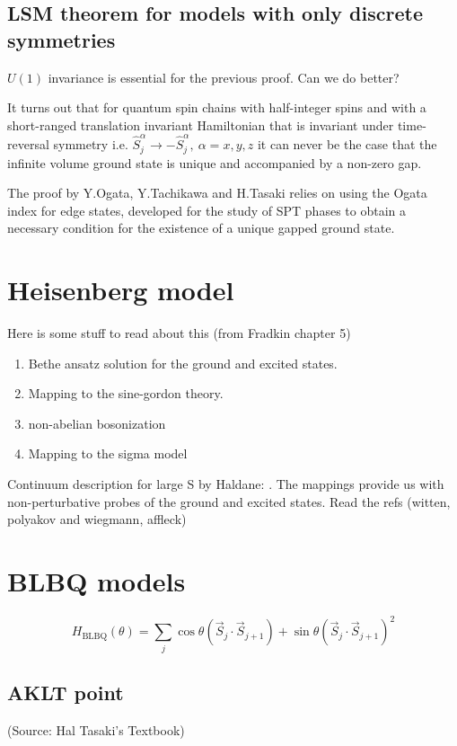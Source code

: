 \documentclass{article}
\begin{document}
\subsection{LSM theorem for models with only discrete symmetries}
$U(1)$ invariance is essential for the previous proof. Can we do better?

It turns out that for quantum spin chains with half-integer spins and with a short-ranged translation invariant Hamiltonian that is invariant under time-reversal symmetry i.e. $\hat{S}^{\alpha}_j \to  -\hat{S}^{\alpha}_j,~ \alpha = x, y, z$ it can never be the case that the infinite volume ground state is unique and accompanied by a non-zero gap.

The proof by Y.Ogata, Y.Tachikawa and H.Tasaki relies on using the Ogata index for edge states, developed for the study of SPT phases to obtain a necessary condition for the existence of a unique gapped ground state.
\section{Heisenberg model}
Here is some stuff to read about this (from Fradkin chapter 5)

\begin{enumerate}
    \item Bethe ansatz solution for the ground and excited states.
    \item Mapping to the sine-gordon theory.
    \item non-abelian bosonization
    \item Mapping to the sigma model
\end{enumerate}
Continuum description for large S by Haldane: \cite{PhysRevLett.50.1153}.
The mappings provide us with non-perturbative probes of the ground and excited states. Read the refs (witten, polyakov and wiegmann, affleck)
\section{BLBQ models}
\begin{equation}
    H_{\text{BLBQ}} \left(\theta\right) = \sum_j \cos{\theta} \left(\vec{S}_j\cdot \vec{S}_{j+1}\right) + \sin{\theta} \left(\vec{S}_j\cdot \vec{S}_{j+1}\right)^2
\end{equation}
\subsection{AKLT point}
(Source: Hal Tasaki's Textbook)
\end{document}
